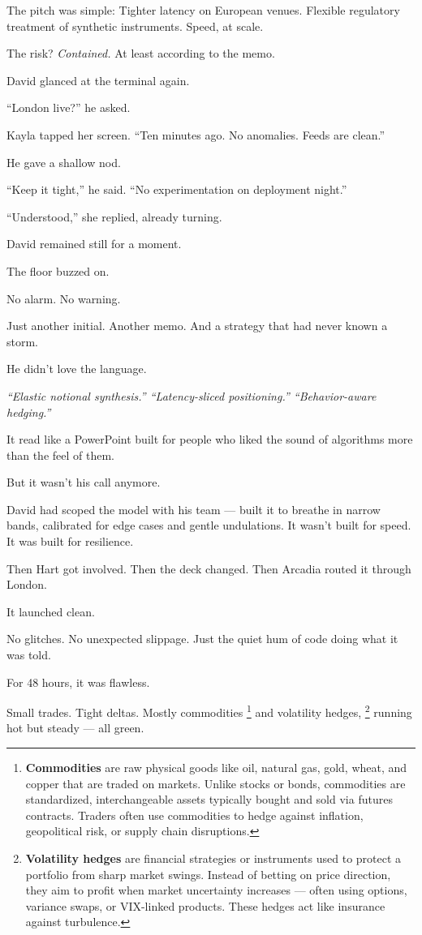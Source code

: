 \medskip




The pitch was simple:
Tighter latency on European venues.
Flexible regulatory treatment of synthetic instruments.
Speed, at scale.

The risk?
\textit{Contained.} At least according to the memo.

David glanced at the terminal again.

“London live?” he asked.

Kayla tapped her screen. “Ten minutes ago. No anomalies. Feeds are clean.”

He gave a shallow nod.

“Keep it tight,” he said. “No experimentation on deployment night.”

“Understood,” she replied, already turning.

David remained still for a moment.

The floor buzzed on.

No alarm.
No warning.

Just another initial.
Another memo.
And a strategy that had never known a storm.


He didn’t love the language.

\textit{“Elastic notional synthesis.” “Latency-sliced positioning.” “Behavior-aware hedging.”}

It read like a PowerPoint built for people who liked the sound of algorithms more than the feel of them.

But it wasn’t his call anymore.

David had scoped the model with his team — built it to breathe in narrow bands, calibrated for edge 
cases and gentle undulations.
It wasn’t built for speed.
It was built for resilience.

Then Hart got involved.
Then the deck changed.
Then Arcadia routed it through London.

It launched clean.

No glitches. No unexpected slippage.
Just the quiet hum of code doing what it was told.

For 48 hours, it was flawless.

Small trades.
Tight deltas.
Mostly commodities
\footnote{\textbf{Commodities} are raw physical goods like oil, natural gas, gold, wheat, and copper that are traded 
on markets. Unlike stocks or bonds, commodities are standardized, interchangeable assets typically bought and sold via 
futures contracts. Traders often use commodities to hedge against inflation, geopolitical risk, or supply chain 
disruptions.}
and volatility hedges, 
\footnote{\textbf{Volatility hedges} are financial strategies or instruments used to protect a portfolio from sharp market 
swings. Instead of betting on price direction, they aim to profit when market uncertainty increases — often using options, 
variance swaps, or VIX-linked products. These hedges act like insurance against turbulence.}
running hot but steady — all green.

